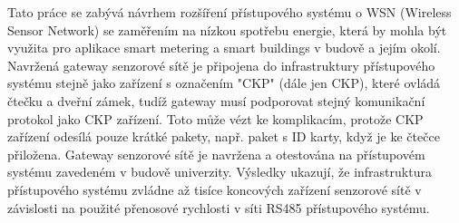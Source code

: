 Tato práce se zabývá návrhem rozšíření přístupového systému o WSN (Wireless Sensor Network) se zaměřením na nízkou spotřebu energie, která by mohla být využita pro aplikace smart metering a smart buildings v budově a jejím okolí.
Navržená gateway senzorové sítě je připojena do infrastruktury přístupového systému stejně jako zařízení s označením "CKP" (dále jen CKP), které ovládá čtečku a dveřní zámek, tudíž gateway musí podporovat stejný komunikační protokol jako CKP zařízení. 
Toto může vézt ke komplikacím, protože CKP zařízení odesílá pouze krátké pakety, např. paket s ID karty, když je ke čtečce přiložena.
Gateway senzorové sítě je navržena a otestována na přístupovém systému zavedeném v budově univerzity.
Výsledky ukazují, že infrastruktura přístupového systému zvládne až tisíce koncových zařízení senzorové sítě v závislosti na použité přenosové rychlosti v síti RS485 přístupového systému.










